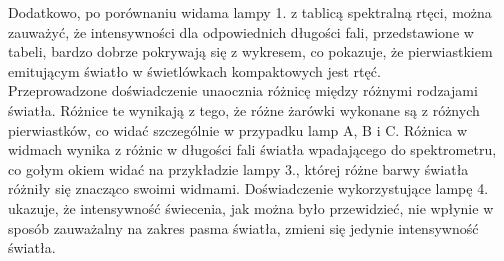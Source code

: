 \documentclass[10pt,a4paper]{article}
\newcommand{\forceindent}{\leavevmode{\parindent=3em\indent}}
\begin{document}
\forceindent Dodatkowo, po porównaniu widama lampy 1. z tablicą spektralną rtęci, można zauważyć, że intensywności dla odpowiednich długości fali, przedstawione w tabeli, bardzo dobrze pokrywają się z wykresem, co pokazuje, że pierwiastkiem emitującym światło w świetlówkach kompaktowych jest rtęć. \\

\forceindent Przeprowadzone doświadczenie unaocznia różnicę między różnymi rodzajami światła. Różnice te wynikają z tego, że różne żarówki wykonane są z różnych pierwiastków, co widać szczególnie w przypadku lamp A, B i C. Różnica w widmach wynika z różnic w długości fali światła wpadającego do spektrometru, co gołym okiem widać na przykładzie lampy 3., której różne barwy światła różniły się znacząco swoimi widmami. Doświadczenie wykorzystujące lampę 4. ukazuje, że intensywność świecenia, jak można było przewidzieć, nie wpłynie w sposób zauważalny na zakres pasma światła, zmieni się jedynie intensywność światła.
\end{document}
